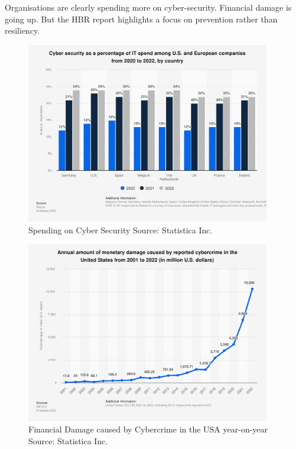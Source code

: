 \documentclass{article}
\begin{document}
Organisations are clearly spending more on cyber-security.  Financial damage is going up. But the HBR report highlights a focus on prevention rather than resiliency.

\begin{figure}[!ht] %
  \includegraphics[width=0.95\textwidth]{statistic_id1245356_share-of-it-spend-on-cyber-security-in-the-us-and-europe-2020-2022-by-country.png}\hfill
  \caption{Spending on Cyber Security  \autocite{Hiscox:2022}  Source: Statistica Inc.}
  \label{fig:cybersecurity-spending}
\end{figure}

\begin{figure}[!ht] %
  \includegraphics[width=0.95\textwidth]{statistic_id267132_annual-amount-of-financial-damage-caused-by-reported-cybercrime-in-us-2001-2022.png}\hfill
  \caption{Financial Damage caused by Cybercrime in the USA year-on-year \autocite{FBI:2023} Source: Statistica Inc.}
  \label{fig:cybercrime-cost}
\end{figure}
\end{document}
